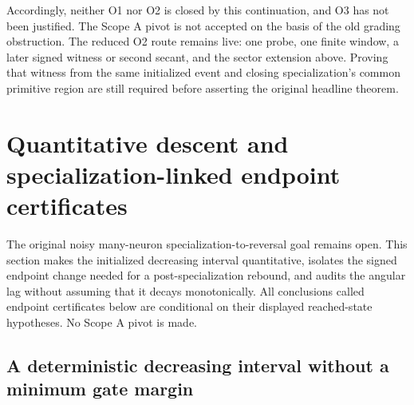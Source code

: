 \documentclass{article} %
\theoremstyle{plain}
\theoremstyle{definition}
\theoremstyle{remark}
\begin{document}
Accordingly, neither O1 nor O2 is closed by this continuation, and O3
has not been justified. The Scope A pivot is not accepted on the basis
of the old grading obstruction. The reduced O2 route remains live:
one probe, one finite window, a later signed witness or second secant,
and the sector extension above. Proving that witness from the same
initialized event and closing specialization's common primitive region
are still required before asserting the original headline theorem.

\section{Quantitative descent and specialization-linked endpoint certificates}
\label{sbend:scope}

The original noisy many-neuron specialization-to-reversal goal remains open.
This section makes the initialized decreasing interval quantitative, isolates
the signed endpoint change needed for a post-specialization rebound, and
audits the angular lag without assuming that it decays monotonically.
All conclusions called endpoint certificates below are conditional on their
displayed reached-state hypotheses. No Scope A pivot is made.

\subsection{A deterministic decreasing interval without a minimum gate margin}
\end{document}
